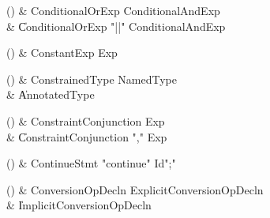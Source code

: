 \begin{bbgrammarappendix}

() & ConditionalOrExp \label{prod:ConditionalOrExp}  \: ConditionalAndExp  \\

 &    \| ConditionalOrExp \xcd"||" ConditionalAndExp \\

\end{bbgrammarappendix}

\begin{bbgrammarappendix}

() & ConstantExp \label{prod:ConstantExp}  \: Exp  \\


\end{bbgrammarappendix}

\begin{bbgrammarappendix}

() & ConstrainedType \label{prod:ConstrainedType}  \: NamedType  \\

 &    \| AnnotatedType \\

\end{bbgrammarappendix}

\begin{bbgrammarappendix}

() & ConstraintConjunction \label{prod:ConstraintConjunction}  \: Exp  \\

 &    \| ConstraintConjunction \xcd"," Exp \\

\end{bbgrammarappendix}

\begin{bbgrammarappendix}

() & ContinueStmt \label{prod:ContinueStmt}  \: \xcd"continue" Id\opt \xcd";"  \\


\end{bbgrammarappendix}

\begin{bbgrammarappendix}

() & ConversionOpDecln \label{prod:ConversionOpDecln}  \: ExplicitConversionOpDecln  \\

 &    \| ImplicitConversionOpDecln \\

\end{bbgrammarappendix}

